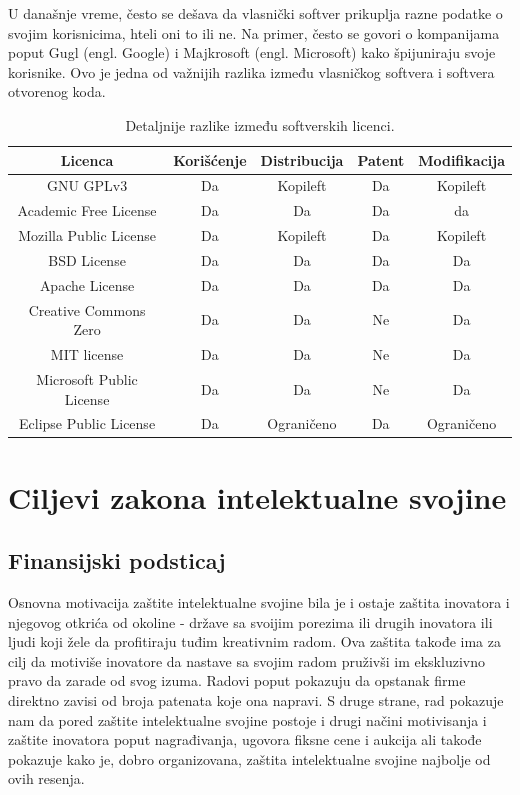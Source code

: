 \documentclass[a4paper]{article}
\begin{document}
U današnje vreme, često se dešava da vlasnički softver prikuplja razne podatke o svojim korisnicima,
hteli oni to ili ne. Na primer, često se govori o kompanijama poput Gugl (engl. Google) i Majkrosoft (engl. Microsoft) 
kako špijuniraju svoje korisnike. Ovo je jedna od važnijih razlika između vlasničkog softvera i softvera otvorenog koda.

\begin{table}[h!]
    \begin{center}
        \caption{ Detaljnije razlike između softverskih licenci. }
        \begin{tabular}{|c|c|c|c|c|} \hline
            Licenca &  Korišćenje & Distribucija & Patent & Modifikacija \\ \hline
            GNU GPLv3 & Da & Kopileft & Da & Kopileft\\ \hline
            Academic Free License & Da & Da & Da & da \\ \hline
            Mozilla Public License & Da & Kopileft & Da & Kopileft \\ \hline
            BSD License & Da & Da & Da & Da \\ \hline
            Apache License & Da & Da & Da & Da  \\ \hline
            Creative Commons Zero & Da & Da & Ne & Da \\ \hline
            MIT license & Da & Da & Ne & Da \\ \hline
            Microsoft Public License & Da & Da & Ne & Da \\ \hline
            Eclipse Public License & Da & Ograničeno & Da & Ograničeno \\ \hline
        \end{tabular}
        \label{tab:tabela1}
    \end{center}
\end{table}

\section{Ciljevi zakona intelektualne svojine}

\subsection{Finansijski podsticaj}

Osnovna motivacija zaštite intelektualne svojine bila je i ostaje zaštita inovatora i njegovog otkrića od okoline - države sa svoijim porezima ili drugih
inovatora ili ljudi koji žele da profitiraju tuđim kreativnim radom.
Ova zaštita takođe ima za cilj da motiviše inovatore da nastave sa svojim
radom pruživši im ekskluzivno pravo da zarade od svog izuma. Radovi poput \cite{patents} 
pokazuju da opstanak firme direktno zavisi od broja patenata koje ona napravi.
S druge strane, rad \cite{patents} pokazuje nam da pored zaštite intelektualne svojine 
postoje i drugi načini motivisanja i zaštite inovatora poput nagrađivanja, 
ugovora fiksne cene i aukcija ali takođe pokazuje kako je, dobro
organizovana, zaštita intelektualne svojine najbolje od ovih resenja.
\end{document}
